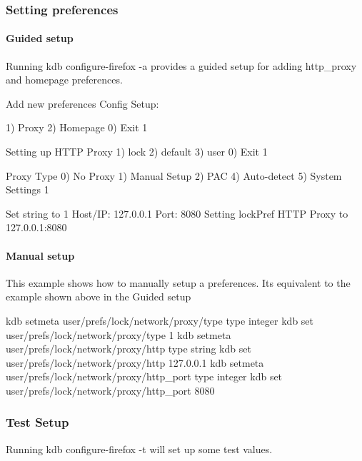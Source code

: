 \subsubsection*{Setting preferences}

\paragraph*{Guided setup}

Running {\ttfamily kdb configure-\/firefox -\/a} provides a guided setup for adding http\+\_\+proxy and homepage preferences.


\begin{DoxyCode}
Add new preferences
Config Setup:

1) Proxy
2) Homepage
0) Exit
1

Setting up HTTP Proxy
1) lock
2) default
3) user
0) Exit
1

Proxy Type
0) No Proxy
1) Manual Setup
2) PAC
4) Auto-detect
5) System Settings
1

Set string to 1
Host/IP: 127.0.0.1
Port: 8080
Setting lockPref HTTP Proxy to 127.0.0.1:8080
\end{DoxyCode}


\paragraph*{Manual setup}

This example shows how to manually setup a preferences. It\textquotesingle{}s equivalent to the example shown above in the {\ttfamily Guided setup} 
\begin{DoxyCode}
kdb setmeta user/prefs/lock/network/proxy/type type integer
kdb set user/prefs/lock/network/proxy/type 1
kdb setmeta user/prefs/lock/network/proxy/http type string
kdb set user/prefs/lock/network/proxy/http 127.0.0.1
kdb setmeta user/prefs/lock/network/proxy/http\_port type integer
kdb set user/prefs/lock/network/proxy/http\_port 8080
\end{DoxyCode}


\subsubsection*{Test Setup}

Running {\ttfamily kdb configure-\/firefox -\/t} will set up some test values.


